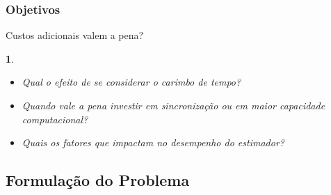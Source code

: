 \documentclass{beamer}
\renewcommand{\(}{\left(}
\renewcommand{\)}{\right)}
\renewcommand{\[}{\left[}
\renewcommand{\]}{\right]}
\newtheorem{definicao}{}
\begin{document}
\begin{frame}
	\frametitle{Objetivos}
	
	Custos adicionais valem a pena?
	\vspace{0.3cm}
	
	
	\begin{definicao}	
		\begin{itemize}
			\item Qual o efeito de se considerar o carimbo de tempo?
			\vspace{0.5cm}
			\item Quando vale a pena investir em sincronização ou em maior capacidade computacional?
			\vspace{0.5cm}
			\item Quais os fatores que impactam no desempenho do estimador?
		\end{itemize}
	\end{definicao}

\end{frame}


\subsection{Formulação do Problema} 

\end{document}
